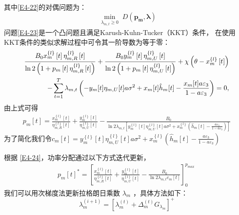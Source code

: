其中\eqref{E4-22}的对偶问题为：
\begin{equation} \label{E4-23}
\min_{\substack{\lambda_{m,t}\geq 0}} D\left(\mathbf{p_m},\mathbf{\lambda}\right)
\end{equation}
问题\eqref{E4-23}是一个凸问题且满足Karush-Kuhn-Tucker（KKT）条件，
在使用KKT条件的类似求解过程中可令其一阶导数为等于零：
\begin{align}\label{E4-24}
\frac{{{B}_{0}}x_{m}^{\left\{ l \right\}}\left[ t \right]\eta _{m,R}^{\left\{ l \right\}}\left[ t \right]}{\ln 2\left( 1+{{p}_{m}}\left[ t \right]\eta _{m,R}^{\left\{ l \right\}}\left[ t \right] \right)}+\frac{{{B}_{0}}y_{m}^{\left\{ l \right\}}\left[ t \right]\eta _{m,U}^{\left\{ l \right\}}\left[ t \right]}{\ln 2\left( 1+{{p}_{m}}\left[ t \right]\eta _{m,U}^{\left\{ l \right\}}\left[ t \right] \right)}+\chi \left( \theta -x_{m}^{\left\{ l \right\}}\left[ t \right] \right) \\   \notag
-\sum\limits_{t=1}^{T}{{{\lambda }_{m,t}}}\left( -{{y}_{m}}[t]{{\eta }_{m,U}}[t]a{{\sigma }^{2}}+{{x}_{m}}[t]{{{\hat{h}}}_{m}}[t]-\frac{{{x}_{m}}[t]a{{\varepsilon }_{3}}}{1-a{{\varepsilon }_{3}}} \right)=0,
\end{align}
由上式可得
\begin{align}\label{E4-25}
\!\!\!\!{{p}_{m}}\left[ t \right]=\frac{x_{m}^{\left\{ l \right\}}\left[ t \right]}{\eta _{m,R}^{\left\{ l \right\}}\left[ t \right]}+\frac{y_{m}^{\left\{ l \right\}}\left[ t \right]}{\eta _{m,U}^{\left\{ l \right\}}\left[ t \right]}-\frac{{{B}_{0}}}{\ln 2{{\lambda }_{m,t}}\left[ y_{m}^{\left\{ l \right\}}\left[ t \right]\eta _{m,U}^{\left\{ l \right\}}\left[ t \right]a{{\sigma }^{2}}+x_{m}^{\left\{ l \right\}}\left( {{{\hat{h}}}_{m}}[t]-\frac{a{{\varepsilon }_{3}}}{1-a{{\varepsilon }_{3}}} \right) \right]}
\end{align}
为了简化我们令${{c}_{m}}\left[ t \right]=y_{m}^{\left\{ l \right\}}\left[ t \right]\eta _{m,U}^{\left\{ l \right\}}\left[ t \right]a{{\sigma }^{2}}+x_{m}^{\left\{ l \right\}}\left( {{{\hat{h}}}_{m}}[t]-\frac{a{{\varepsilon }_{3}}}{1-a{{\varepsilon }_{3}}} \right)$

根据 \eqref{E4-24}，功率分配通过以下方式迭代更新，
\begin{align} \label{E4-26}
{{p}_{m}}{{\left[ t \right]}^{*}}=\left[ \frac{x_{m}^{\left\{ l \right\}}\left[ t \right]}{\eta _{m,R}^{\left\{ l \right\}}\left[ t \right]}+\frac{y_{m}^{\left\{ l \right\}}\left[ t \right]}{\eta _{m,U}^{\left\{ l \right\}}\left[ t \right]}-\frac{{{B}_{0}}}{\ln 2{{\lambda }_{m,t}}{{c}_{m}}\left[ t \right]} \right]_{0}^{{{p}_{max}}\ }
\end{align}
我们可以用次梯度法更新拉格朗日乘数 $\lambda_m$ ，具体方法如下：
\begin{equation}\label{E4-27}
\lambda _{m}^{\left( i+1 \right)}={{\left[ \lambda _{m}^{\left( t \right)}+\Delta _{m}^{\left( t \right)}{{G}_{{{\lambda}_{m}}}} \right]}^{+}}
\end{equation}

